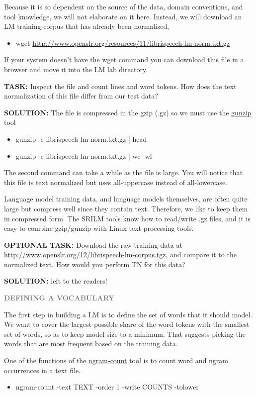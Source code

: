 Because it is so dependent on the source of the data, domain conventions, and tool knowledge, we will not elaborate on it here. Instead, we will download an LM training corpus that has already been normalized,
\begin{itemize}
	\item wget \url{http://www.openslr.org/resources/11/librispeech-lm-norm.txt.gz}
\end{itemize}

If your system doesn’t have the wget command you can download this file in a browser and move it into the LM lab directory.

{\bf TASK:} Inspect the file and count lines and word tokens. How does the text normalization of this file differ from our test data?

{\bf SOLUTION:} The file is compressed in the gzip (.gz) so we must use the \href{https://www.gnu.org/software/gzip/manual/gzip.html}{gunzip} tool
\begin{itemize}
	\item gunzip -c librispeech-lm-norm.txt.gz | head
	\item gunzip -c librispeech-lm-norm.txt.gz | wc -wl
\end{itemize}

The second command can take a while as the file is large. You will notice that this file is text normalized but uses all-uppercase instead of all-lowercase.

Language model training data, and language models themselves, are often quite large but compress well since they contain text. Therefore, we like to keep them in compressed form. The SRILM tools know how to read/write .gz files, and it is easy to combine gzip/gunzip with Linux text processing tools.

{\bf OPTIONAL TASK:} Download the raw training data at \url{http://www.openslr.org/12/librispeech-lm-corpus.tgz}, and compare it to the normalized text. How would you perform TN for this data?

{\bf SOLUTION:} left to the readers!

{\bf \textcolor{gray}{DEFINING A VOCABULARY}}

The first step in building a LM is to define the set of words that it should model. We want to cover the largest possible share of the word tokens with the smallest set of words, so as to keep model size to a minimum. That suggests picking the words that are most frequent based on the training data.

One of the functions of the \href{http://www.speech.sri.com/projects/srilm/manpages/ngram-count.1.html}{ngram-count} tool is to count word and ngram occurrences in a text file.
\begin{itemize}
	\item ngram-count -text TEXT -order 1 -write COUNTS -tolower
\end{itemize}

